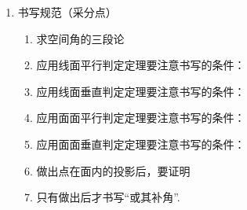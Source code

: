 \begin{enumerate}
\begin{enumerate}
\begin{enumerate}
                ，适用情况
                \item 垂面法（三垂线法）
        
                ，适用情况
            \end{enumerate}

            二面角的范围是\blkda[4]{$[0, \pi]$}
    \end{enumerate}
    
    \item 书写规范（采分点）
    \begin{enumerate}
        \item 求空间角的三段论
        \item 应用线面平行判定定理要注意书写的条件：
        \item 应用线面垂直判定定理要注意书写的条件：
        \item 应用面面平行判定定理要注意书写的条件：
        \item 应用面面垂直判定定理要注意书写的条件：
        \item 做出点在面内的投影后，要证明
        \item 只有做出后才书写“或其补角”.
    \end{enumerate}
\end{enumerate}